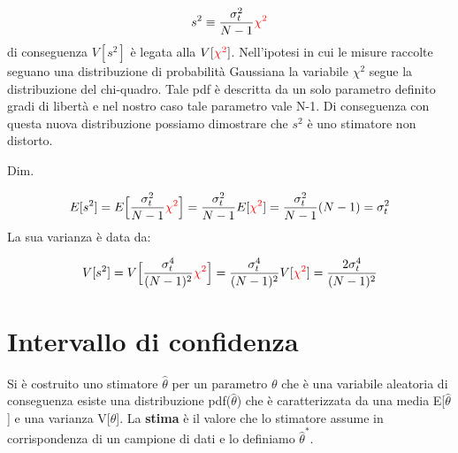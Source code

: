 \begin{equation*}
	s^2 \equiv \dfrac{\sigma_t^2}{N-1}\textcolor{red}{\chi^2}
\end{equation*}
\newline
di conseguenza $V[s^2]$ \`{e} legata alla $V[\textcolor{red}{\chi^2}]$. Nell'ipotesi in cui le misure raccolte seguano una distribuzione di probabilit\`{a} Gaussiana la variabile $\chi^2$ segue la distribuzione del chi-quadro. Tale pdf \`{e} descritta da un solo parametro definito gradi di libert\`{a} e nel nostro caso tale parametro vale N-1. 
\newline
Di conseguenza con questa nuova distribuzione possiamo dimostrare che $s^2$ \`{e} uno stimatore non distorto.\newline

Dim.

\begin{equation*}
	E[s^2] = E \Big[\dfrac{\sigma_t^2}{N-1}\textcolor{red}{\chi^2} \Big] = \dfrac{\sigma_t^2}{N-1}E[\textcolor{red}{\chi^2}] = \dfrac{\sigma_t^2}{N-1}(N-1) = \sigma_t^2
\end{equation*}
\newline
La sua varianza \`{e} data da:

\begin{equation*}
	V[s^2] = V \Big [ \dfrac{\sigma_t^4}{(N-1)^2}\textcolor{red}{\chi^2} \Big] = \dfrac{\sigma_t^4}{(N-1)^2}V[\textcolor{red}{\chi^2}] = \dfrac{2\sigma_t^4}{(N-1)^2} 
	\end{equation*}

\section{Intervallo di confidenza}

Si \`{e} costruito uno stimatore $\hat{\theta}$ per un parametro $\theta$ che \`{e} una variabile aleatoria di conseguenza esiste una distribuzione pdf($\hat{\theta}$) che \`{e} caratterizzata da una media E[$\hat{\theta}$] e una varianza V[$\hat{\theta}$]. La \textbf{stima} \`{e} il valore che lo stimatore assume in corrispondenza di un campione di dati e lo definiamo $\hat{\theta}^*$.\newline

